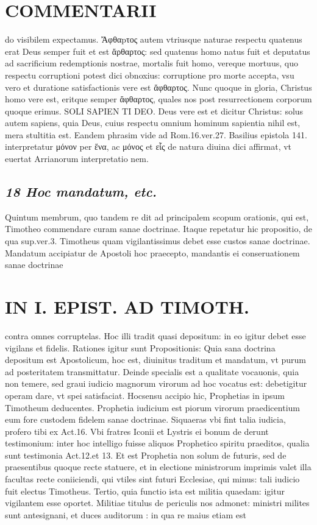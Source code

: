 \documentclass{article}
\begin{document}
\begin{pages}
\section*{COMMENTARII }
\marginpar{[ p.36 ]}\pstart do visibilem expectamus. Ἄφθαpτος autem vtriusque naturae respectu quatenus erat Deus semper fuit et est ἄρθαρτος: sed quatenus homo natus fuit et deputatus ad sacrificium redemptionis nostrae, mortalis fuit homo, vereque mortuus, quo respectu corruptioni potest dici obnoxius: corruptione pro morte accepta, vsu vero et duratione satisfactionis vere est ἄφθαρτος. Nunc quoque in gloria, Christus homo vere est, eritque semper ἄφθαρτος, quales nos post resurrectionem corporum quoque erimus. SOLI SAPIEN TI DEO. Deus vere est et dicitur Christus: solus autem sapiens, quia Deus, cuius respectu omnium  hominum sapientia nihil est, mera stultitia est. Eandem phrasim vide ad Rom.16.ver.27. Basilius epistola 141. interpretatur μόνον per ἕνα, ac μόνος et εἷς  de natura diuina dici affirmat, vt euertat Arrianorum interpretatio nem.  \pend
{}
{}
\subsection*{\textit{18 Hoc mandatum, etc. }}\pstart Quintum membrum, quo tandem re dit ad principalem scopum orationis, qui est, Timotheo commendare curam sanae doctrinae. Itaque repetatur hic propositio, de qua sup.ver.3. Timotheus quam vigilantissimus debet esse custos sanae doctrinae. Mandatum accipiatur de Apostoli hoc praecepto, mandantis ei conseruationem sanae doctrinae  \pend
\section*{IN I. EPIST. AD TIMOTH. }
\marginpar{[ p.39 ]}\pstart contra omnes corruptelas. Hoc illi tradit quasi depositum: in eo igitur debet esse vigilans et fidelis. Rationes igitur sunt Propositionis: Quia sana doctrina depositum est Apostolicum, hoc est, diuinitus traditum et mandatum, vt purum ad posteritatem transmittatur. Deinde specialis est a qualitate vocauonis, quia non temere, sed graui iudicio magnorum virorum ad hoc vocatus est: debetigitur operam dare, vt spei satisfaciat. Hocsensu accipio hic, Prophetias in ipsum Timotheum deducentes. Prophetia iudicium est piorum virorum praedicentium eum fore custodem fidelem sanae doctrinae.  \pend\pstart Siquaeras vbi fint talia iudicia, profero tibi ex Act.16. Vbi fratres Iconii et Lystris ei bonum de derunt testimonium: inter hoc intelligo fuisse aliquos Prophetico spiritu praeditos, qualia sunt testimonia Act.12.et 13. Et est Prophetia non solum de futuris, sed de praesentibus quoque recte statuere, et in electione ministrorum imprimis valet illa facultas recte coniiciendi, qui vtiles sint futuri Ecclesiae, qui minus: tali iudicio fuit electus Timotheus. Tertio, quia functio ista est militia quaedam: igitur vigilantem esse oportet. Militiae titulus de periculis nos admonet: ministri milites sunt antesignani, et duces auditorum : in qua re maius etiam est  \pend

\end{pages}
\end{document}
